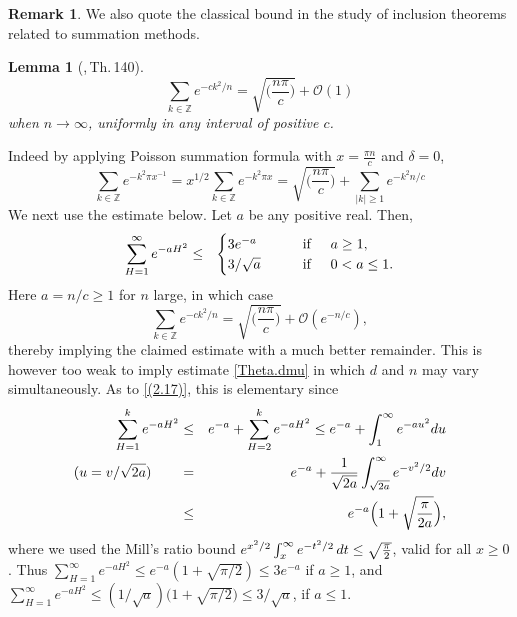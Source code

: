 \documentclass[11pt,draft,reqno]{amsart}
\newtheorem{lemma}[theorem]{Lemma}
\theoremstyle{definition}
\theoremstyle{remarks}
\newtheorem{remark}[theorem]{{\bf  Remark}}
\numberwithin{equation}{section}
\def \d{{\delta}}
\def \qq{{\qquad}}
\def\Z{{\mathbb Z}}
\begin{document}
\begin{remark}
We also quote the classical bound in the study of   inclusion theorems related to  summation methods. 
\begin{lemma} [\cite{H},\,Th.\,140] \label{exp.square}
\begin{equation}\sum_{k\in \Z} e^{-ck^2/n} =\sqrt{\Big(\frac{n\pi}{c}\Big)} +\mathcal O(1)
\end{equation}
when $n\to \infty$, uniformly in any interval of positive $c$.
\end{lemma}
Indeed by applying Poisson summation formula    with $x=\frac{\pi n }{c}$ and $\d=0$, \begin{equation} \sum_{k\in \Z} e^{-k^2\pi x^{-1}}=x^{1/2}   \sum_{k\in \Z}e^{-k^2\pi x}=\sqrt{\Big(\frac{n\pi}{c}\Big)} +\sum_{|k|\ge 1 } e^{-k^2n /c}  
    \end{equation} 
 We next use the  estimate below. Let $a$ be any positive real. Then,  
\begin{equation}\label{(2.17)} \sum_{H=1}^\infty e^{-aH^2}\le \ \ \begin{cases}   3e^{-a} & \qq {\rm  if}\quad \  a\ge 1,\cr
       {3 /\sqrt a}   & \qq {\rm  if}\quad  \ 0<a\le 1 .
       \end{cases}
       \end{equation}
Here $a=n/c\ge 1 $ for $n$ large, in which case
\begin{equation}\sum_{k\in \Z} e^{-ck^2/n}=\sqrt{\Big(\frac{n\pi}{c}\Big)} +\mathcal O(  e^{-n/c}), 
    \end{equation} 
 thereby implying the claimed estimate with a much better remainder.
 This   is however too weak to imply estimate \eqref{Theta.dmu} in which  $d$   and $n$ may vary simultaneously.
As to \eqref{(2.17)}, this is elementary since \begin{eqnarray*}
\sum_{H=1}^k e^{-aH^2}&\le &e^{-a } +\sum_{H=2}^k e^{-a H^2 }  \le  e^{-a } + \int_{1}^\infty
  e^{-au^2}du
 \cr 
   (u=v/\sqrt{2a})\qq &  =  & e^{-a } + {1\over \sqrt{ 2a}}\int_{\sqrt{ 2a}}^\infty
  e^{-v^2/2}dv \cr &\le  &e^{-a }\Big(1 + \sqrt{{\pi\over   2a }} \Big),  \end{eqnarray*}
 where   we used the Mill's ratio bound $ e^{ x^2/2} \int_x^\infty e^{-t^2/2}\, dt  \le \sqrt{{\pi\over 2}}     $,
 valid for all $x\ge 0$. Thus $\sum_{H=1}^\infty e^{-aH^2}\le e^{-a } (1 + \sqrt{{\pi/  2  }}  )\le    3e^{-a}$   if  $a\ge 1$, and
$\sum_{H=1}^\infty e^{-aH^2}\le   (1/ \sqrt a )\big(1 + \sqrt{{\pi/   2  }} \big)\le      3/ \sqrt a  $,  if  $a\le 1$.  
\end{remark} 
\end{document}
